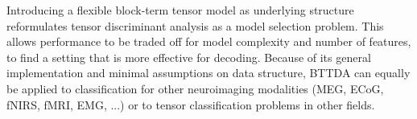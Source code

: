 Introducing a flexible block-term tensor model as underlying structure
reformulates tensor discriminant analysis as a model selection
problem.
This allows performance to be traded off for model complexity and number of
features, to find a setting that is more effective for decoding.
Because of its general implementation and minimal assumptions on data structure,
BTTDA can equally be applied to classification for other neuroimaging modalities
(MEG, ECoG, fNIRS, fMRI, EMG, ...) or to tensor classification problems in other
fields.

